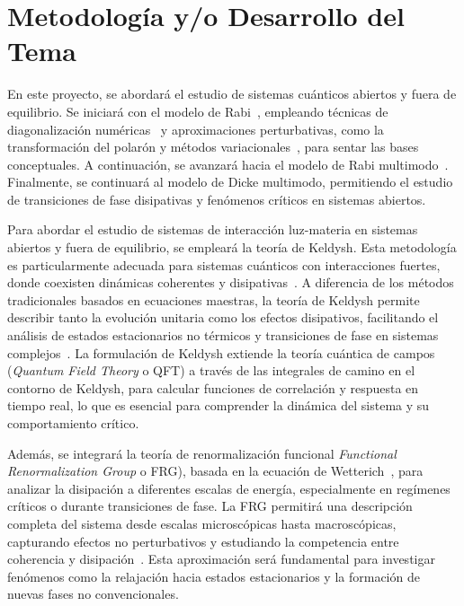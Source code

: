 \documentclass[onecolumn,notitlepage,letterpaper,aps,pra,12pt]{article}
\numberwithin{equation}{section}
\begin{document}

\section{Metodología y/o Desarrollo del Tema}

En este proyecto, se abordará el estudio de sistemas cuánticos abiertos y fuera de equilibrio. Se iniciará con el modelo de Rabi~\cite{rabi1936}, empleando técnicas  de diagonalización numéricas~\cite{irish2007} y aproximaciones perturbativas, como la transformación del polarón y métodos variacionales~\cite{gonzalez2021}, para sentar las bases conceptuales. A continuación, se avanzará hacia el modelo de Rabi multimodo~\cite{peng2021}. Finalmente, se continuará al modelo de Dicke multimodo, permitiendo el estudio de transiciones de fase disipativas y fenómenos críticos en sistemas abiertos. 

Para abordar el estudio de sistemas de interacción luz-materia en sistemas abiertos y fuera de equilibrio, se empleará la teoría de Keldysh. Esta metodología es particularmente adecuada para sistemas cuánticos con interacciones fuertes, donde coexisten dinámicas coherentes y disipativas~\cite{kamenev2023,rammer2011}. A diferencia de los métodos tradicionales basados en ecuaciones maestras, la teoría de Keldysh permite describir tanto la evolución unitaria como los efectos disipativos, facilitando el análisis de estados estacionarios no térmicos y transiciones de fase en sistemas complejos~\cite{Sieberer2016}.  La formulación de Keldysh extiende la teoría cuántica de campos (\textit{Quantum Field Theory} o QFT) a través de las integrales de camino en el contorno de Keldysh, para calcular funciones de correlación y respuesta en tiempo real, lo que es esencial para comprender la dinámica del sistema y su comportamiento crítico.

Además, se integrará la teoría de renormalización funcional \textit{Functional Renormalization Group} o FRG), basada en la ecuación de Wetterich~\cite{wetterich1993}, para analizar la disipación a diferentes escalas de energía, especialmente en regímenes críticos o durante transiciones de fase. La FRG permitirá una descripción completa del sistema desde escalas microscópicas hasta macroscópicas, capturando efectos no perturbativos y estudiando la competencia entre coherencia y disipación~\cite{angelakis2007}. Esta aproximación será fundamental para investigar fenómenos como la relajación hacia estados estacionarios y la formación de nuevas fases no convencionales.
\end{document}
